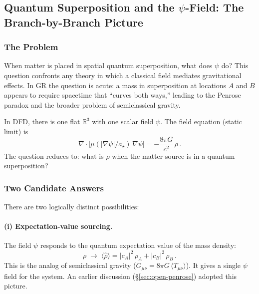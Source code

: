 
\subsection{Quantum Superposition and the $\psi$-Field: The Branch-by-Branch Picture}\label{sec:quantum-superposition}

\subsubsection{The Problem}

When matter is placed in spatial quantum superposition, what does $\psi$ do?  This question confronts any theory in which a classical field mediates gravitational effects.  In GR the question is acute: a mass in superposition at locations $A$ and $B$ appears to require spacetime that ``curves both ways,'' leading to the Penrose paradox and the broader problem of semiclassical gravity.

In DFD, there is one flat $\mathbb{R}^3$ with one scalar field $\psi$.  The field equation (static limit) is
\begin{equation}\label{eq:psi-source-static}
\nabla \cdot \bigl[\mu(|\nabla\psi|/a_\star)\,\nabla\psi\bigr] = -\frac{8\pi G}{c^2}\,\rho\,.
\end{equation}
The question reduces to: what is $\rho$ when the matter source is in a quantum superposition?

\subsubsection{Two Candidate Answers}

There are two logically distinct possibilities:

\paragraph{(i) Expectation-value sourcing.}
The field $\psi$ responds to the quantum expectation value of the mass density:
\begin{equation}\label{eq:expect-source}
\rho \;\to\; \langle\hat\rho\rangle = |c_A|^2\,\rho_A + |c_B|^2\,\rho_B\,.
\end{equation}
This is the analog of semiclassical gravity ($G_{\mu\nu} = 8\pi G\,\langle T_{\mu\nu}\rangle$).  It gives a single $\psi$ field for the system.  An earlier discussion (\S\ref{sec:open-penrose}) adopted this picture.

